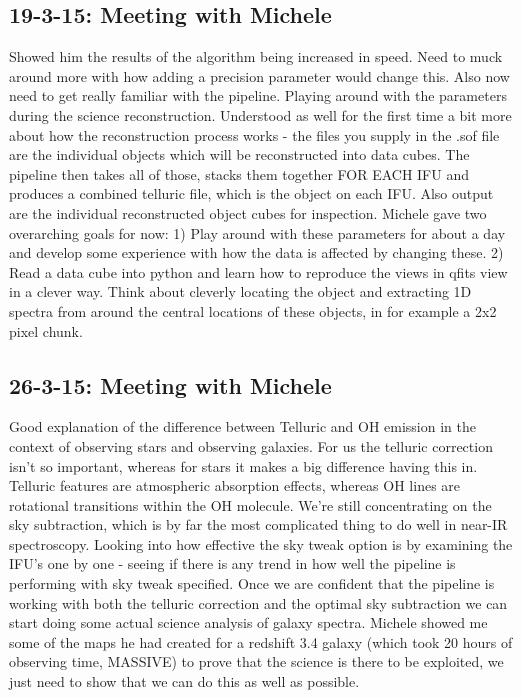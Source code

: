 \documentclass{literature}
\begin{document}
\subsection{19-3-15: Meeting with Michele}
Showed him the results of the algorithm being increased in speed. Need to muck around more with how adding a precision parameter would change this. Also now need to get really familiar with the pipeline. Playing around with the parameters during the science reconstruction. Understood as well for the first time a bit more about how the reconstruction process works - the files you supply in the .sof file are the individual objects which will be reconstructed into data cubes. The pipeline then takes all of those, stacks them together FOR EACH IFU and produces a combined telluric file, which is the object on each IFU. Also output are the individual reconstructed object cubes for inspection. Michele gave two overarching goals for now: 1) Play around with these parameters for about a day and develop some experience with how the data is affected by changing these. 2) Read a data cube into python and learn how to reproduce the views in qfits view in a clever way. Think about cleverly locating the object and extracting 1D spectra from around the central locations of these objects, in for example a 2x2 pixel chunk. 

\subsection{26-3-15: Meeting with Michele}
Good explanation of the difference between Telluric and OH emission in the context of observing stars and observing galaxies. For us the telluric correction isn't so important, whereas for stars it makes a big difference having this in. Telluric features are atmospheric absorption effects, whereas OH lines are rotational transitions within the OH molecule. We're still concentrating on the sky subtraction, which is by far the most complicated thing to do well in near-IR spectroscopy. Looking into how effective the sky tweak option is by examining the IFU's one by one - seeing if there is any trend in how well the pipeline is performing with sky tweak specified. Once we are confident that the pipeline is working with both the telluric correction and the optimal sky subtraction we can start doing some actual science analysis of galaxy spectra. Michele showed me some of the maps he had created for a redshift 3.4 galaxy (which took 20 hours of observing time, MASSIVE) to prove that the science is there to be exploited, we just need to show that we can do this as well as possible.  
\end{document}
